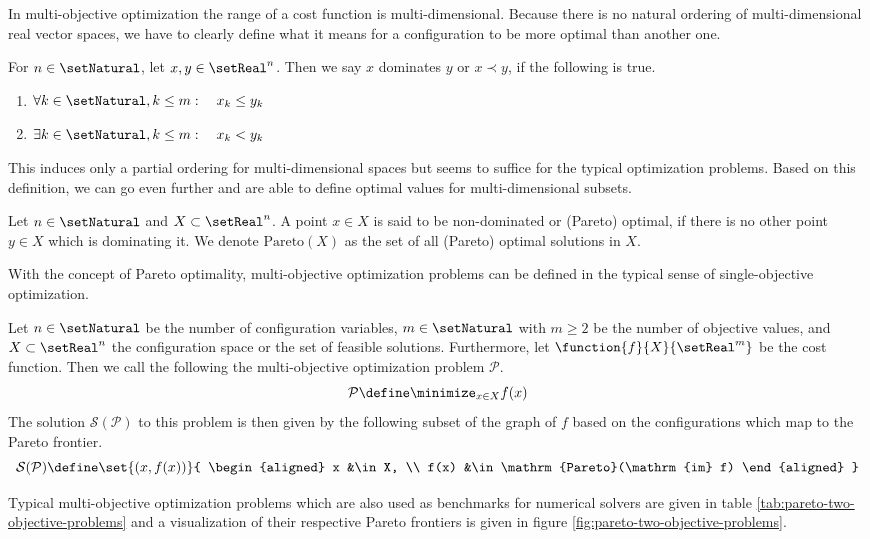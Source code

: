 \documentclass{stdlocal}
\begin{document}
    In multi-objective optimization the range of a cost function is multi-dimensional.
    Because there is no natural ordering of multi-dimensional real vector spaces, we have to clearly define what it means for a configuration to be more optimal than another one.
    \begin{definition*}[Domination]
      For $n\in\setNatural$, let $x,y\in \setReal^n$.
      Then we say $x$ dominates $y$ or $x\prec y$, if the following is true.
      \begin{enumerate}[label={(\arabic*)}]
        \item $\forall k\in\setNatural, k\leq m:\quad x_k\leq y_k$
        \item $\exists k\in\setNatural, k\leq m:\quad x_k < y_k$
      \end{enumerate}
    \end{definition*}
    This induces only a partial ordering for multi-dimensional spaces but seems to suffice for the typical optimization problems.
    Based on this definition, we can go even further and are able to define optimal values for multi-dimensional subsets.
    \begin{definition*}
      Let $n\in\setNatural$ and $X\subset\setReal^n$. A point $x\in X$ is said to be non-dominated or (Pareto) optimal, if there is no other point $y\in X$ which is dominating it.
      We denote $\mathrm{Pareto}(X)$ as the set of all (Pareto) optimal solutions in $X$.
    \end{definition*}
    With the concept of Pareto optimality, multi-objective optimization problems can be defined in the typical sense of single-objective optimization.
    \begin{definition*}
      Let $n\in\setNatural$ be the number of configuration variables, $m\in\setNatural$ with $m\geq 2$ be the number of objective values, and $X\subset\setReal^n$ the configuration space or the set of feasible solutions.
      Furthermore, let $\function{f}{X}{\setReal^m}$ be the cost function.
      Then we call the following the multi-objective optimization problem $\mathcal{P}$.
      \[
        \mathcal{P} \define \minimize_{x\in X} f(x)
      \]
      The solution $\mathcal{S}(\mathcal{P})$ to this problem is then given by the following subset of the graph of $f$ based on the configurations which map to the Pareto frontier.
      \[
        \mathcal{S}(\mathcal{P}) \define
        \set{(x,f(x))}{
        \begin{aligned}
          x &\in X, \\
          f(x) &\in \mathrm{Pareto}(\mathrm{im} f)
        \end{aligned}
        }
      \]
    \end{definition*}
    Typical multi-objective optimization problems which are also used as benchmarks for numerical solvers are given in table \ref{tab:pareto-two-objective-problems} and a visualization of their respective Pareto frontiers is given in figure \ref{fig:pareto-two-objective-problems}.
\end{document}
